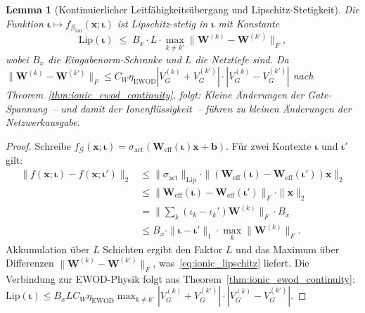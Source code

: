 ﻿\documentclass[12pt, a4paper, openany]{report}
\newtheorem{lemma}[theorem]{Lemma}
\newcommand{\calG}{\mathcal{G}}
\begin{document}
\begin{lemma}[Kontinuierlicher Leitfähigkeitsübergang und Lipschitz-Stetigkeit]
\label{lem:ionic_lipschitz}
Die Funktion $\bm{\iota} \mapsto f_{\calG_{\mathrm{ion}}}(\bm{x};\bm{\iota})$
ist Lipschitz-stetig in $\bm{\iota}$ mit Konstante
\begin{equation}
  \label{eq:ionic_lipschitz}
  \mathrm{Lip}(\bm{\iota}) \;\leq\; B_x \cdot L \cdot
  \max_{k \neq k'} \|\bm{W}^{(k)} - \bm{W}^{(k')}\|_F,
\end{equation}
wobei $B_x$ die Eingabenorm-Schranke und $L$ die Netztiefe sind.
Da $\|\bm{W}^{(k)}-\bm{W}^{(k')}\|_F \leq C_W \eta_{\mathrm{EWOD}}
|V_G^{(k)}+V_G^{(k')}|  \cdot |V_G^{(k)}-V_G^{(k')}|$
nach Theorem~\ref{thm:ionic_ewod_continuity}, folgt: Kleine
Änderungen der Gate-Spannung~-- und damit der Ionenflüssigkeit~--
führen zu kleinen Änderungen der Netzwerkausgabe.
\end{lemma}

\begin{proof}
Schreibe $f_{\calG}(\bm{x}; \bm{\iota}) = \sigma_{\mathrm{act}}(\bm{W}_{\mathrm{eff}}(\bm{\iota})\bm{x}
+ \bm{b})$.  Für zwei Kontexte $\bm{\iota}$ und $\bm{\iota}'$ gilt:
\begin{align*}
  \|f(\bm{x};\bm{\iota}) - f(\bm{x};\bm{\iota}')\|_2
  &\leq \|\sigma_{\mathrm{act}}\|_{\mathrm{Lip}} \cdot \|(\bm{W}_{\mathrm{eff}}(\bm{\iota})
    - \bm{W}_{\mathrm{eff}}(\bm{\iota}'))\bm{x}\|_2 \\
  &\leq \|\bm{W}_{\mathrm{eff}}(\bm{\iota}) - \bm{W}_{\mathrm{eff}}(\bm{\iota}')\|_F
    \cdot \|\bm{x}\|_2 \\
  &= \bigl\|\sum_k (\iota_k - \iota_k')\bm{W}^{(k)}\bigr\|_F \cdot B_x \\
  &\leq B_x \cdot \|\bm{\iota} - \bm{\iota}'\|_1 \cdot \max_k \|\bm{W}^{(k)}\|_F.
\end{align*}
Akkumulation über $L$ Schichten ergibt den Faktor $L$ und das Maximum
über Differenzen $\|\bm{W}^{(k)} - \bm{W}^{(k')}\|_F$, was~\eqref{eq:ionic_lipschitz}
liefert.  Die Verbindung zur EWOD-Physik folgt aus
Theorem~\ref{thm:ionic_ewod_continuity}: $\mathrm{Lip}(\bm{\iota}) \leq
B_x L C_W \eta_{\mathrm{EWOD}} \max_{k\neq k'} |V_G^{(k)}+V_G^{(k')}|
\cdot |V_G^{(k)}-V_G^{(k')}|$.
\end{proof}
\end{document}
